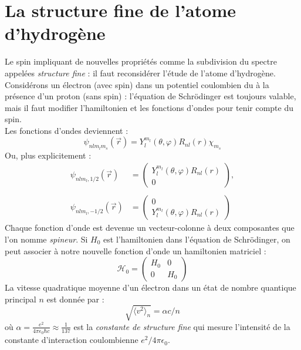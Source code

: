 \documentclass[british,french,11pt, a4paper, openany]{book}
\begin{document}
\section{La structure fine de l'atome d'hydrogène}
Le spin impliquant de nouvelles propriétés comme la subdivision du spectre appelées 
\textit{structure fine} : il faut reconsidérer l'étude de l'atome d'hydrogène.\\
Considérons un électron (avec spin) dans un potentiel coulombien du à la présence 
d'un proton (sans spin) : l'équation de Schrödinger est toujours valable, mais il 
faut modifier l'hamiltonien et les fonctions d'ondes pour tenir compte du spin.\\
Les fonctions d'ondes deviennent : 
\begin{equation}
	\psi_{nlm_lm_s}(\vec{r}) = Y_l^{m_l}(\theta,\varphi)R_{nl}(r)\chi_{m_s}
\end{equation}
Ou, plus explicitement :
\begin{equation}
	\begin{array}{ll}
		\psi_{nlm_l,1/2}(\vec{r}) & = \left(\begin{array}{cc} 
			Y_l^{m_l}(\theta,\varphi)R_{nl}(r)\\
			0
		\end{array}\right),\\
		& \\
		\psi_{nlm_l,-1/2}(\vec{r}) &= \left(\begin{array}{cc}
			0\\
			Y_l^{m_l}(\theta,\varphi)R_{nl}(r)
		\end{array}\right)
	\end{array}
\end{equation}
Chaque fonction d'onde est devenue un vecteur-colonne à deux composantes que l'on 
nomme \textit{spineur}. Si $H_0$ est l’hamiltonien dans l'équation de Schrödinger,
on peut associer à notre nouvelle fonction d'onde un hamiltonien matriciel :
\begin{equation}
	\mathcal{H}_0 =\left(\begin{array}{cc}
		H_0 & 0\\
		0 & H_0
	\end{array}\right)
\end{equation}
La vitesse quadratique moyenne d'un électron dans un état de nombre quantique 
principal $n$ est donnée par :
\begin{equation}
	\sqrt{\langle v^2\rangle_n} = \alpha c/n
\end{equation}
où $\alpha = \frac{e^2}{4\pi\epsilon_0\hbar c}	 \approx \frac{1}{137}$ est la \textit{
	constante de structure fine} qui mesure l'intensité de la constante d'interaction 
coulombienne $e^2/4\pi\epsilon_0$.\\
\end{document}
